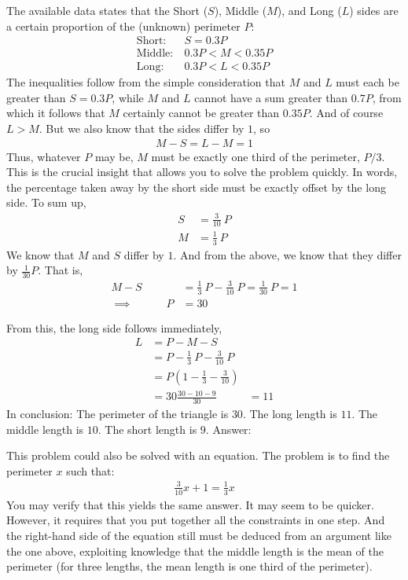 \documentclass[12pt]{article}
\begin{document}
\begin{answer}
The available data states that the Short ($S$), Middle ($M$), and Long ($L$) sides are a certain proportion of the (unknown) perimeter $P$:
\begin{align*}
\text{Short}:~  & S = 0.3 P \\
\text{Middle}:~ & 0.3 P < M < 0.35 P\\
\text{Long}:~   & 0.3 P < L < 0.35 P
\end{align*}
The inequalities follow from the simple consideration that $M$ and $L$ must each be greater than $S=0.3P$, while $M$ and $L$ cannot have a sum greater than $0.7P$, from which it follows that $M$ certainly cannot be greater than $0.35P$. And of course $L>M$. But we also know that the sides differ by $1$, so 
\begin{align*}
M-S = L-M = 1
\end{align*}
Thus, whatever $P$ may be, $M$ must be exactly one third of the perimeter, $P/3$. This is the crucial insight that allows you to solve the problem quickly. In words, the percentage taken away by the short side must be exactly offset by the long side. To sum up,
\begin{align*}
S & = \tfrac{3}{10}~P \\
M & = \tfrac{1}{3}~P 
\end{align*}
We know that $M$ and $S$ differ by $1$. And from the above, we know that they differ by $\tfrac{1}{30}P$. That is,
\begin{align*}
M - S 
& = \tfrac{1}{3}~P - \tfrac{3}{10}~P 
= \tfrac{1}{30}~P = 1 \\
\implies \hspace{3em} P 
& = 30
\end{align*}

From this, the long side follows immediately,
\begin{align*}
L & = P - M - S \\
& = P - \frac{1}{3}~P - \frac{3}{10}~P \\
& = P \left(1 - \frac{1}{3} - \frac{3}{10}\right) \\
& = 30 \frac{30-10-9}{30}
& = 11
\end{align*}
In conclusion: The perimeter of the triangle is $30$. The long length is $11$. The middle length is $10$. The short length is $9$. Answer: 

This problem could also be solved with an equation. The problem is to find the perimeter $x$ such that:
\begin{align*}
\frac{3}{10} x + 1 = \frac{1}{3} x
\end{align*}
You may verify that this yields the same answer. It may seem to be quicker. However, it requires that you put together all the constraints in one step. And the right-hand side of the equation still must be deduced from an argument like the one above, exploiting knowledge that the middle length is the mean of the perimeter (for three lengths, the mean length is one third of the perimeter). 
\end{answer}
\end{document}
